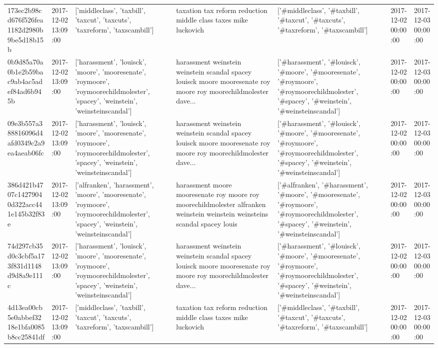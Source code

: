 \begin{tabular}{lllllll}
173ec2b98cd676f526fea1182d2980b9be5d18b15b & 2017-12-02 13:09:00 & ['middleclass', 'taxbill', 'taxcut', 'taxcuts', 'taxreform', 'taxscambill'] & taxation tax reform reduction middle class taxes mike luckovich & ['#middleclass', '#taxbill', '#taxcut', '#taxcuts', '#taxreform', '#taxscambill'] & 2017-12-02 00:00:00 & 2017-12-03 00:00:00 \\
0b9d85a70a0b1e2b59bac9ab4ac5adef84ad6b945b & 2017-12-02 13:09:00 & ['harassment', 'louisck', 'moore', 'mooresenate', 'roymoore', 'roymoorechildmolester', 'spacey', 'weinstein', 'weinsteinscandal'] & harassment weinstein weinstein scandal spacey louisck moore mooresenate roy moore roy moorechildmolester dave... & ['#harassment', '#louisck', '#moore', '#mooresenate', '#roymoore', '#roymoorechildmolester', '#spacey', '#weinstein', '#weinsteinscandal'] & 2017-12-02 00:00:00 & 2017-12-03 00:00:00 \\
09e3b557a388816096d4afd0349c2a9ea4aeab06fc & 2017-12-02 13:09:00 & ['harassment', 'louisck', 'moore', 'mooresenate', 'roymoore', 'roymoorechildmolester', 'spacey', 'weinstein', 'weinsteinscandal'] & harassment weinstein weinstein scandal spacey louisck moore mooresenate roy moore roy moorechildmolester dave... & ['#harassment', '#louisck', '#moore', '#mooresenate', '#roymoore', '#roymoorechildmolester', '#spacey', '#weinstein', '#weinsteinscandal'] & 2017-12-02 00:00:00 & 2017-12-03 00:00:00 \\
386d421b4707c14279040d322acc441e145b32f83e & 2017-12-02 13:09:00 & ['alfranken', 'harassment', 'moore', 'mooresenate', 'roymoore', 'roymoorechildmolester', 'spacey', 'weinstein', 'weinsteinscandal'] & harassment moore mooresenate roy moore roy moorechildmolester alfranken weinstein weinstein weinsteins scandal spacey louis & ['#alfranken', '#harassment', '#moore', '#mooresenate', '#roymoore', '#roymoorechildmolester', '#spacey', '#weinstein', '#weinsteinscandal'] & 2017-12-02 00:00:00 & 2017-12-03 00:00:00 \\
74d297cb35d0c3cbf5a173f831d1148d9d8a9e111c & 2017-12-02 13:09:00 & ['harassment', 'louisck', 'moore', 'mooresenate', 'roymoore', 'roymoorechildmolester', 'spacey', 'weinstein', 'weinsteinscandal'] & harassment weinstein weinstein scandal spacey louisck moore mooresenate roy moore roy moorechildmolester dave... & ['#harassment', '#louisck', '#moore', '#mooresenate', '#roymoore', '#roymoorechildmolester', '#spacey', '#weinstein', '#weinsteinscandal'] & 2017-12-02 00:00:00 & 2017-12-03 00:00:00 \\
4d13ea00cb5e0abbef3218e1bfa0085b8cc25841df & 2017-12-02 13:09:00 & ['middleclass', 'taxbill', 'taxcut', 'taxcuts', 'taxreform', 'taxscambill'] & taxation tax reform reduction middle class taxes mike luckovich & ['#middleclass', '#taxbill', '#taxcut', '#taxcuts', '#taxreform', '#taxscambill'] & 2017-12-02 00:00:00 & 2017-12-03 00:00:00 \\

\end{tabular}
